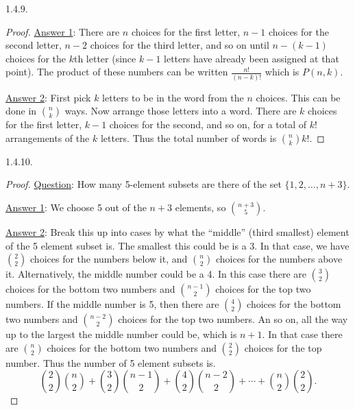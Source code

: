 \begin {itemize}
\begin{ans}{1.4.9.}
\begin{proof}
         \underline{Answer 1}: There are $n$ choices for the first letter, $n-1$ choices for the second letter, $n-2$ choices for the third letter, and so on until $n - (k-1)$ choices for the $k$th letter (since $k-1$ letters have already been assigned at that point).  The product of these numbers can be written $\frac{n!}{(n-k)!}$ which is $P(n,k)$.

         \underline{Answer 2}: First pick $k$ letters to be in the word from the $n$ choices.  This can be done in ${n \choose k}$ ways.  Now arrange those letters into a word.  There are $k$ choices for the first letter, $k-1$ choices for the second, and so on, for a total of $k!$ arrangements of the $k$ letters.  Thus the total number of words is ${n \choose k}k!$.
        \end{proof}
	
\end{ans}
\begin{ans}{1.4.10.}
		\begin{proof}
		\underline{Question}: How many 5-element subsets are there of the set $\{1,2,\ldots, n+3\}$.

		\underline{Answer 1}: We choose 5 out of the $n+3$ elements, so ${n+3 \choose 5}$.

		\underline{Answer 2}: Break this up into cases by what the ``middle'' (third smallest) element of the 5 element subset is.  The smallest this could be is a 3.  In that case, we have ${2 \choose 2}$ choices for the numbers below it, and ${n \choose 2}$ choices for the numbers above it.  Alternatively, the middle number could be a 4.  In this case there are ${3 \choose 2}$ choices for the bottom two numbers and ${n-1 \choose 2}$ choices for the top two numbers.  If the middle number is 5, then there are ${4 \choose 2}$ choices for the bottom two numbers and ${n-2 \choose 2}$ choices for the top two numbers.  An so on, all the way up to the largest the middle number could be, which is $n+1$.  In that case there are ${n \choose 2}$ choices for the bottom two numbers and ${2 \choose 2}$ choices for the top number.  Thus the number of 5 element subsets is.
		\[{2 \choose 2}{n \choose 2} + {3 \choose 2}{n-1 \choose 2} + {4\choose 2}{n-2 \choose 2} + \cdots + {n\choose 2}{2\choose 2}.\]
		\end{proof}
	
\end{ans}
\protect \end {itemize}
